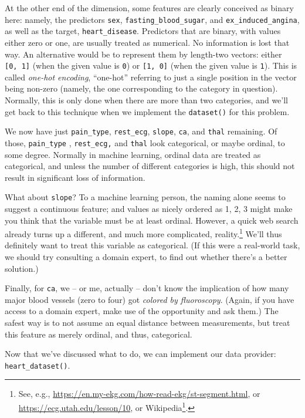 \documentclass[
  letterpaper,
]{krantz}
\DeclareRobustCommand{\href}[2]{#2\footnote{\url{#1}}}
\begin{document}
At the other end of the dimension, some features are clearly conceived
as binary here: namely, the predictors \texttt{sex},
\texttt{fasting\_blood\_sugar}, and \texttt{ex\_induced\_angina}, as
well as the target, \texttt{heart\_disease}. Predictors that are binary,
with values either zero or one, are usually treated as numerical. No
information is lost that way. An alternative would be to represent them
by length-two vectors: either \texttt{{[}0,\ 1{]}} (when the given value
is \texttt{0}) or \texttt{{[}1,\ 0{]}} (when the given value is
\texttt{1}). This is called \emph{one-hot
encoding}, ``one-hot'' referring to just a
single position in the vector being non-zero (namely, the one
corresponding to the category in question). Normally, this is only done
when there are more than two categories, and we'll get back to this
technique when we implement the \texttt{dataset()} for this problem.

We now have just \texttt{pain\_type}, \texttt{rest\_ecg},
\texttt{slope}, \texttt{ca}, and \texttt{thal} remaining. Of those,
\texttt{pain\_type} , \texttt{rest\_ecg,} and \texttt{thal} look
categorical, or maybe ordinal, to some degree. Normally in machine
learning, ordinal data are treated as categorical, and unless the number
of different categories is high, this should not result in significant
loss of information.

What about \texttt{slope}? To a machine learning person, the naming
alone seems to suggest a continuous feature; and values as nicely
ordered as 1, 2, 3 might make you think that the variable must be at
least ordinal. However, a quick web search already turns up a different,
and much more complicated, reality.\footnote{See, e.g.,
  \url{https://en.my-ekg.com/how-read-ekg/st-segment.html}, or
  \url{https://ecg.utah.edu/lesson/10}, or
  \href{https://en.wikipedia.org/wiki/ST_segment}{Wikipedia}.} We'll
thus definitely want to treat this variable as categorical. (If this
were a real-world task, we should try consulting a domain expert, to
find out whether there's a better solution.)

Finally, for \texttt{ca}, we -- or me, actually -- don't know the
implication of how many major blood vessels (zero to four) got
\emph{colored by fluoroscopy}. (Again, if you have access to a domain
expert, make use of the opportunity and ask them.) The safest way is to
not assume an equal distance between measurements, but treat this
feature as merely ordinal, and thus, categorical.

Now that we've discussed what to do, we can implement our data provider:
\texttt{heart\_dataset()}.
\end{document}
